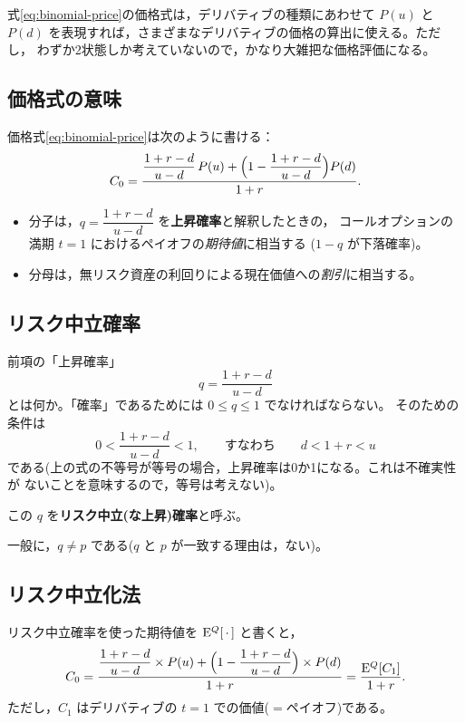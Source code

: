 式\eqref{eq:binomial-price}の価格式は，デリバティブの種類にあわせて $P(u)$ と
$P(d)$ を表現すれば，さまざまなデリバティブの価格の算出に使える。ただし，
わずか2状態しか考えていないので，かなり大雑把な価格評価になる。

\subsection{価格式の意味}

価格式\eqref{eq:binomial-price}は次のように書ける：
\begin{equation}
C_0 = \frac{\dfrac{1+r-d}{u-d}\,P(u)
+ \Bigl(1 - \dfrac{1+r-d}{u-d}\Bigr)P(d)}{1+r}.
\label{eq:price-meaning}
\end{equation}
\begin{itemize}
\item 分子は，$q = \dfrac{1+r-d}{u-d}$ を\textbf{上昇確率}と解釈したときの，
コールオプションの満期 $t=1$ におけるペイオフの\emph{期待値}に相当する
($1-q$ が下落確率)。
\item 分母は，無リスク資産の利回りによる現在価値への\emph{割引}に相当する。
\end{itemize}

\subsection{リスク中立確率}

前項の「上昇確率」
\begin{equation}
q = \frac{1+r-d}{u-d}
\label{eq:q-def}
\end{equation}
とは何か。「確率」であるためには $0 \leq q \leq 1$ でなければならない。
そのための条件は
\[
0 < \frac{1+r-d}{u-d} < 1,
\qquad\text{すなわち}\qquad
d < 1+r < u
\]
である(上の式の不等号が等号の場合，上昇確率は0か1になる。これは不確実性が
ないことを意味するので，等号は考えない)。

\begin{definition}[リスク中立確率]
この $q$ を\textbf{リスク中立(な上昇)確率}と呼ぶ。
\end{definition}

一般に，$q \neq p$ である($q$ と $p$ が一致する理由は，ない)。

\subsection{リスク中立化法}

リスク中立確率を使った期待値を $\mathrm{E}^Q[\,\cdot\,]$ と書くと，
\begin{equation}
C_0 = \frac{\dfrac{1+r-d}{u-d}\times P(u)
+ \Bigl(1-\dfrac{1+r-d}{u-d}\Bigr)\times P(d)}{1+r}
= \frac{\mathrm{E}^Q[C_1]}{1+r}.
\label{eq:risk-neutral-method}
\end{equation}
ただし，$C_1$ はデリバティブの $t=1$ での価値($=$ペイオフ)である。

